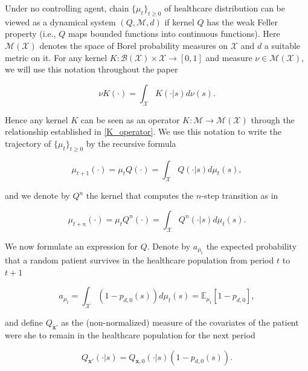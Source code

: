 \documentclass[12pt,a4paper]{article}
\newcommand{\bx}{\mathbf{x}}
\begin{document}
	
	Under no controlling agent, chain $\{\mu_t\}_{t\geq0}$ of healthcare distribution can be viewed as a dynamical system $(Q, \mathcal{M},d)$ if kernel $Q$ has the weak Feller property (i.e., $Q$ maps bounded functions into continuous functions). Here $\mathcal{M}(\mathcal{X})$ denotes the space of Borel probability measures on $\mathcal{X}$ and $d$ a suitable metric on it. For any kernel $K: \mathcal{B}(\mathcal{X}) \times \mathcal{X} \rightarrow [0,1]$ and measure $\nu \in \mathcal{M}(\mathcal{X})$, we will use this notation throughout the paper
	
	\begin{equation}\label{K_operator}
		\nu K(\cdot)=\int_{\mathcal{X}} K(\cdot |s) d\nu(s).
	\end{equation}
	
	
	\noindent  Hence any kernel $K$ can be seen as an operator $K:\mathcal{M} \rightarrow \mathcal{M}(\mathcal{X})$ through the relationship established in \eqref{K_operator}. We use this notation to write the trajectory of $\{\mu_t\}_{t\geq0}$ by the recursive formula
	
	\begin{equation} \label{transition_mu1}
		\mu_{t+1}(\cdot)=\mu_tQ(\cdot)=\int_{\mathcal{X}} Q(\cdot |s) d\mu_t(s),
	\end{equation}
	
	\noindent and we denote by $Q^n$ the kernel that computes the $n$-step transition as in
	
	\begin{equation} \label{transition_mu}
		\mu_{t+n}(\cdot)=\mu_t Q^n(\cdot)=\int_{\mathcal{X}} Q^n(\cdot | s) d\mu_t(s).
	\end{equation}
	
	\noindent We now formulate an expression for  $Q$. Denote by $a_{\mu_t}$ the expected probability that a random patient survives in the healthcare population from period $t$ to $t+1$
	
	\begin{equation} \label{at}
		a_{\mu_t}=\int_{\mathcal{X}} (1-p_{d,0}(s)) d\mu_t(s)=\mathbb{E}_{\mu_t} \left[ 1-p_{d,0} \right],
	\end{equation}
	
	\noindent and define $Q_{\bx'}$ as the (non-normalized) measure of the covariates of the patient were she to remain in the healthcare population for the next period 
	
	\begin{equation} \label{Qx'}
		Q_{\bx'}(\cdot|s)=Q_{\bx,0}(\cdot|s) (1-p_{d,0}(s)).
	\end{equation}
	
\end{document}
